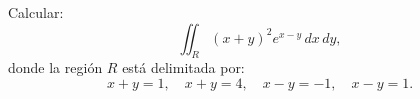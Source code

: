 \documentclass[12pt]{article}
\begin{document}
Calcular:
\[
\iint_R (x+y)^2 e^{x-y} \, dx \, dy,
\]
donde la región \( R \) está delimitada por:
\[
x + y = 1, \quad x + y = 4, \quad x - y = -1, \quad x - y = 1.
\]
\end{document}
